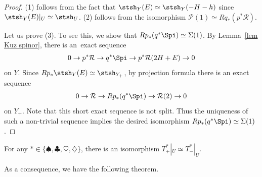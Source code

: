 \begin{proof}
(1) follows from the fact that $\stsh_Y(E) \simeq \stsh_Y(-H-h)$ since $\stsh_Y(E)|_U \simeq \stsh_U$.
(2) follows from the isomorphism $\mathcal{P}(1) \simeq Rq_*(p^*\mathcal{R})$.

Let us prove (3).
To see this, we show that $Rp_*(q^*\Spi) \simeq \Sigma(1)$.
By Lemma~\ref{lem Kuz spinor}, there is an~exact sequence
\begin{gather*}
0 \to p^*\mathcal{R} \to q^* \Spi \to p^* \mathcal{R}(2H+E) \to 0
\end{gather*}
on $Y$.
Since $Rp_*\stsh_Y(E) \simeq \stsh_{Y_+}$, by projection formula there is an exact sequence
\begin{gather*}
0 \to \mathcal{R} \to Rp_*(q^* \Spi) \to \mathcal{R}(2) \to 0
\end{gather*}
on $Y_+$.
Note that this short exact sequence is not split.
Thus the uniqueness of such a non-trivial sequence implies the desired isomorphism $Rp_*(q^*\Spi) \simeq \Sigma(1)$.
\end{proof}

\begin{Corollary}
For any $\ast \in \{ \spadesuit, \clubsuit, \heartsuit, \diamondsuit \}$, there is an isomorphism $T_+^{\ast}|_U \simeq T_-^{\ast}|_U$.
\end{Corollary}

As a consequence, we have the following theorem.
